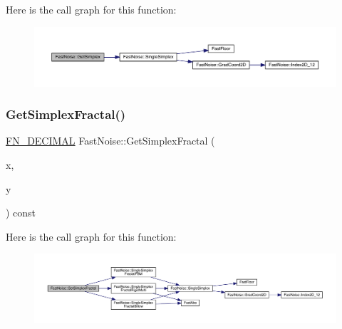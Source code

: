 Here is the call graph for this function\+:
\nopagebreak
\begin{figure}[H]
\begin{center}
\leavevmode
\includegraphics[width=350pt]{d1/dd8/class_fast_noise_a699fc06c0d6abe30627c2131606b6bfa_cgraph}
\end{center}
\end{figure}
\mbox{\label{class_fast_noise_a7b839d08e67cfa821b4c1094c9d50e95}} 
\subsubsection{\texorpdfstring{Get\+Simplex\+Fractal()}{GetSimplexFractal()}\hspace{0.1cm}{\footnotesize\ttfamily [1/2]}}
{\footnotesize\ttfamily \mbox{\hyperlink{_fast_noise_8h_a75a9ef6d2541c4921815b885bfd449c3}{F\+N\+\_\+\+D\+E\+C\+I\+M\+AL}} Fast\+Noise\+::\+Get\+Simplex\+Fractal (\begin{DoxyParamCaption}\item[{\mbox{\hyperlink{_fast_noise_8h_a75a9ef6d2541c4921815b885bfd449c3}{F\+N\+\_\+\+D\+E\+C\+I\+M\+AL}}}]{x,  }\item[{\mbox{\hyperlink{_fast_noise_8h_a75a9ef6d2541c4921815b885bfd449c3}{F\+N\+\_\+\+D\+E\+C\+I\+M\+AL}}}]{y }\end{DoxyParamCaption}) const}

Here is the call graph for this function\+:
\nopagebreak
\begin{figure}[H]
\begin{center}
\leavevmode
\includegraphics[width=350pt]{d1/dd8/class_fast_noise_a7b839d08e67cfa821b4c1094c9d50e95_cgraph}
\end{center}
\end{figure}
\mbox{\label{class_fast_noise_a56b14e348cf0762010e6c58b6f5243f9}} 
